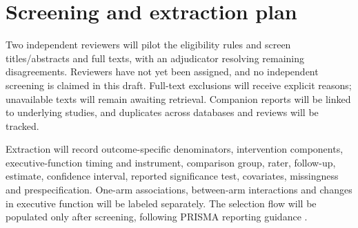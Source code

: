 \section{Screening and extraction plan}
Two independent reviewers will pilot the eligibility rules and screen titles/abstracts and full texts, with an adjudicator resolving remaining disagreements.
Reviewers have not yet been assigned, and no independent screening is claimed in this draft.
Full-text exclusions will receive explicit reasons; unavailable texts will remain awaiting retrieval.
Companion reports will be linked to underlying studies, and duplicates across databases and reviews will be tracked.

Extraction will record outcome-specific denominators, intervention components, executive-function timing and instrument, comparison group, rater, follow-up, estimate, confidence interval, reported significance test, covariates, missingness and prespecification.
One-arm associations, between-arm interactions and changes in executive function will be labeled separately.
The selection flow will be populated only after screening, following PRISMA reporting guidance \citep{Page2021}.
